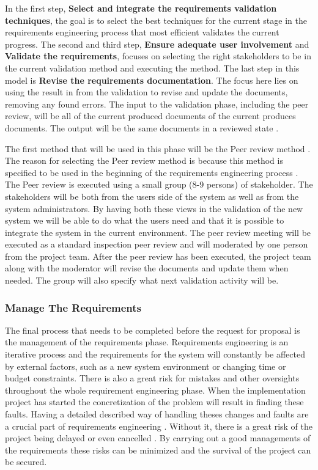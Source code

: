 \documentclass[a4paper]{article}
\begin{document}
In the first step, \textbf{Select and integrate the requirements validation techniques}, the goal is to select the best techniques for the current stage in the requirements engineering process that most efficient validates the current progress. The second and third step, \textbf{Ensure adequate user involvement} and \textbf{Validate the requirements}, focuses on selecting the right stakeholders to be in the current validation method and executing the method. The last step in this model is \textbf{Revise the requirements documentation}. The focus here lies on using the result in from the validation to revise and update the documents, removing any found errors. The input to the validation phase, including the peer review, will be all of the current produced documents of the current produces documents. The output will be the same documents in a reviewed state \cite{gott6}.

The first method that will be used in this phase will be the Peer review method \cite{gott6}. The reason for selecting the Peer review method is because this method is specified to be used in the beginning of the requirements engineering process \cite{gott6}. The Peer review is executed using a small group (8-9 persons) of stakeholder. The stakeholders will be both from the users side of the system as well as from the system administrators. By having both these views in the validation of the new system we will be able to do what the users need and that it is possible to integrate the system in the current environment. The peer review meeting will be executed as a standard inspection peer review \cite{gott6} and will moderated by one person from the project team. After the peer review has been executed, the project team along with the moderator will revise the documents and update them when needed. The group will also specify what next validation activity will be.

\subsubsection{Manage The Requirements}
\label{subsub:manage_the_requirements}
The final process that needs to be completed before the request for proposal is the management of the requirements phase. Requirements engineering is an iterative process and the requirements for the system will constantly be affected by external factors, such as a new system environment or changing time or budget constraints. There is also a great risk for mistakes and other oversights throughout the whole requirement engineering phase. When the implementation project has started the concretization of the problem will result in finding these faults. Having a detailed described way of handling theses changes and faults are a crucial part of requirements engineering \cite{gott7}. Without it, there is a great risk of the project being delayed or even cancelled \cite{gott7}. By carrying out a good managements of the requirements these risks can be minimized and the survival of the project can be secured. 
\end{document}
